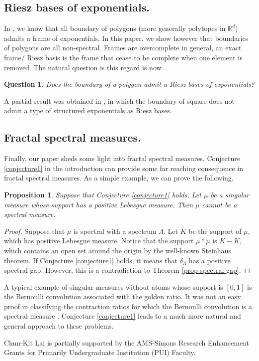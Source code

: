 \documentclass[12pt,a4paper,oneside]{amsart}
\newtheorem{question}{Question}
\newtheorem{proposition}{Proposition}
\theoremstyle{definition}
\newcommand{\RR}{{\mathbb R}}
\newcommand{\wt}[1]{\widetilde{#1}}
\newcounter{rem}
\begin{document}
\subsection{Riesz bases of exponentials.} In \cite{iosevich2022fourier}, we know that all boundary of polygons (more generally polytopes in $\RR^d$) admits {a} frame of exponentials.  In this paper, we show however that  {boundaries} of polygons  are all non-spectral. Frames are overcomplete in general, an exact frame/ Riesz basis  is the frame that cease to be complete when one element is removed.  The natural question is this regard is now 
\begin{question}\label{question3}
Does the boundary of a polygon admit a Riesz bases of exponentials? 
\end{question}
 A partial result was obtained in \cite{lai2023riesz}, in which the boundary of square does not admit a type of structured exponentials as Riesz bases. 

\subsection{Fractal spectral measures.} Finally, our paper  sheds some light {into} fractal spectral measures. Conjecture \ref{conjecture1} in the introduction can provide some far reaching consequence in fractal spectral measures. As a simple example, we can prove the following.

\begin{proposition}
    Suppose that Conjecture \ref{conjecture1} holds. Let $\mu$ be a singular measure whose support has a positive Lebesgue measure. Then $\mu$ cannot be a spectral measure. 
\end{proposition}

\begin{proof}
    Suppose that $\mu$ is spectral with a spectrum $\Lambda$. Let $K$ be the support of $\mu$, which has positive Lebesgue measure. Notice that the support $\mu\ast\wt\mu$ is $K-K$, which contains an open set around the origin by the well-known Steinhaus theorem. If Conjecture \ref{conjecture1} holds, it means that ${\delta_{\Lambda}}$ has a positive spectral gap. However, this is a contradiction to Theorem \ref{prop-spectral-gap}.
\end{proof}

A typical example of singular measures without atoms whose support is $[0,1]$ is the Bernoulli convolution associated with the golden ratio.  It was not an easy proof in classifying the contraction ratios for which the Bernoulli convolution is a spectral measure \cite{HL2008,dai2012does}.  Conjecture \ref{conjecture1} leads to a much more natural and general approach to these problems. 

  Chun-Kit Lai is partially supported by the AMS-Simons Research Enhancement Grants for Primarily Undergraduate Institution (PUI) Faculty.








\end{document}
